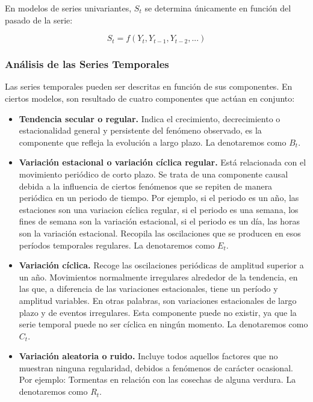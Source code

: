 \documentclass[a4paper,10pt]{article}
\begin{document}
En modelos de series univariantes, $S_t$ se determina únicamente en función del pasado de la serie:

\begin{equation}
 S_t = f(Y_t, Y_{t-1}, Y_{t-2},...)
\end{equation}



\subsubsection{Análisis de las Series Temporales}

Las series temporales pueden ser descritas en función de sus componentes. En ciertos modelos, son resultado de cuatro componentes que actúan en conjunto:

\begin{itemize}

 \item \textbf{Tendencia secular o regular.} Indica el crecimiento, decrecimiento o estacionalidad general y persistente del fenómeno observado, es la componente que refleja la evolución a largo plazo. La denotaremos como $B_t$.

 \item \textbf{Variación estacional o variación cíclica regular.} Está relacionada con el movimiento periódico de corto plazo. Se trata de una componente causal debida a la influencia de ciertos fenómenos que se repiten de manera periódica en un periodo de tiempo. Por ejemplo, si el periodo es un año, las estaciones son una variacion cíclica regular, si el periodo es una semana, los fines de semana son la variación estacional, si el periodo es un día, las horas son la variación estacional. Recopila las oscilaciones que se producen en esos períodos temporales regulares. La denotaremos como $E_t$.

\item \textbf{Variación cíclica.} Recoge las oscilaciones periódicas de amplitud superior a un año. Movimientos normalmente irregulares alrededor de la tendencia, en las que, a diferencia de las variaciones estacionales, tiene un período y amplitud variables. En otras palabras, son variaciones estacionales de largo plazo y de eventos irregulares. Esta componente puede no existir, ya que la serie temporal puede no ser cíclica en ningún momento. La denotaremos como $C_t$.

 \item \textbf{Variación aleatoria o ruido.} Incluye todos aquellos factores que no muestran ninguna regularidad, debidos a fenómenos de carácter ocasional. Por ejemplo: Tormentas en relación con las cosechas de alguna verdura. La denotaremos como $R_t$.

\end{itemize}
\end{document}
